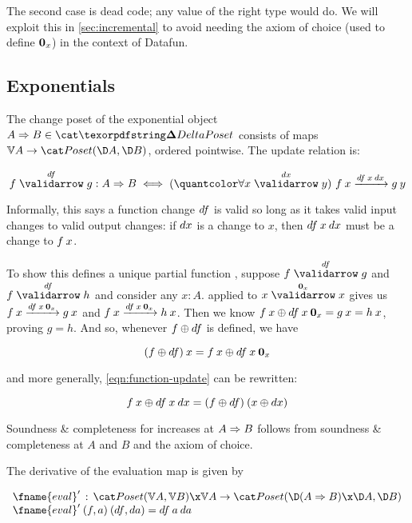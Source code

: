 \documentclass{rntz}\usepackage{fantasy}%
\begin{document}
\noindent
The second case is dead code; any value of the right type would do. We will
exploit this in \cref{sec:incremental} to avoid needing the axiom of choice
(used to define $\boldsymbol{0}_x$) in the context of Datafun.


\subsection{Exponentials}
\label{sec:CP-exponentials}

The change poset of the exponential object $\expO A B \in \CP$ consists of maps
$\vals A \to \Poset(\chgs A, \chgs B)$, ordered pointwise. The update relation
is:

\nopagebreak[2]
\begin{equation}\label{eqn:function-update}
  \vld{\df}{f}{g} : \expO A B
  \iff \fa{\vld\dx x y} \longvld{\df\<x\<\dx} {f\<x} {g\<y}
\end{equation}

\noindent Informally, this says a function change ${df}$ is valid so long as it
takes valid input changes to valid output changes: if ${dx}$ is a change to $x$,
then $\df\<x\<\dx$ must be a change to $f\<x$.

To show this defines a unique partial function \updfn, suppose $\vld\df f g$ and
$\vld\df f h$ and consider any $x : A$.  applied to
$\vld{\zero_x} x x$ gives us $\longvld{\df\<x\<\zero_x}{f\<x}{g\<x}$ and
$\longvld{\df\<x\<\zero_x}{f\<x}{h\<x}$. Then we know \(f\<x \upd
\df\<x\<\zero_x = g\<x = h\<x \), proving $g = h$. And so, whenever $f \mathbin{\oplus} {df}$
is defined, we have

\nopagebreak[2]
\begin{equation*} (f \upd \df)\<x = f\<x \upd \df\<x\<\zero_x \end{equation*}

\noindent
and more generally, \cref{eqn:function-update} can be rewritten:

\nopagebreak[2]
\begin{equation*} f\<x \upd \df\<x\<\dx = (f \upd \df)\<(x \upd \dx) \end{equation*}

\noindent
Soundness \& completeness for increases at $A \Rightarrow B$ follows from soundness \&
completeness at $A$ and $B$ and the axiom of choice. 

The derivative of the evaluation map is given by

\nopagebreak[2]
\[\begin{array}{l}
  \deriv{\fname{eval}} \,:\,
  \Poset(\vals A, \vals B)
  \x \vals A \to
  \Poset({\chgs{(\expO A B)} \x \chgs A},{\chgs B})
  \\
  \deriv{\fname{eval}} \<(f,a) \<(\df,\da) = \df\<a\<\da
\end{array}\]
\end{document}
